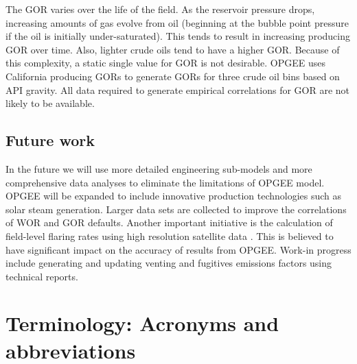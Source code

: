 \documentclass[11pt]{report}
\begin{document}
The GOR varies over the life of the field. As the reservoir pressure drops, increasing amounts of gas evolve from oil (beginning at the bubble point pressure if the oil is initially under-saturated). This tends to result in increasing producing GOR over time. Also, lighter crude oils tend to have a higher GOR. Because of this complexity, a static single value for GOR is not desirable. OPGEE uses California producing GORs to generate GORs for three crude oil bins based on API gravity. All data required to generate empirical correlations for GOR are not likely to be available.\par




\section{Future work}

In the future we will use more detailed engineering sub-models and more comprehensive data analyses to eliminate the limitations of OPGEE model. OPGEE will be expanded to include innovative production technologies such as solar steam generation. Larger data sets are collected to improve the correlations of WOR and GOR defaults. Another important initiative is the calculation of field-level flaring rates using high resolution satellite data \cite{Elvidge2012ARB}. This is believed to have significant impact on the accuracy of results from OPGEE. Work-in progress include generating and updating venting and fugitives emissions factors using technical reports. 






\appendix


















\chapter{Terminology: Acronyms and abbreviations}
\end{document}

